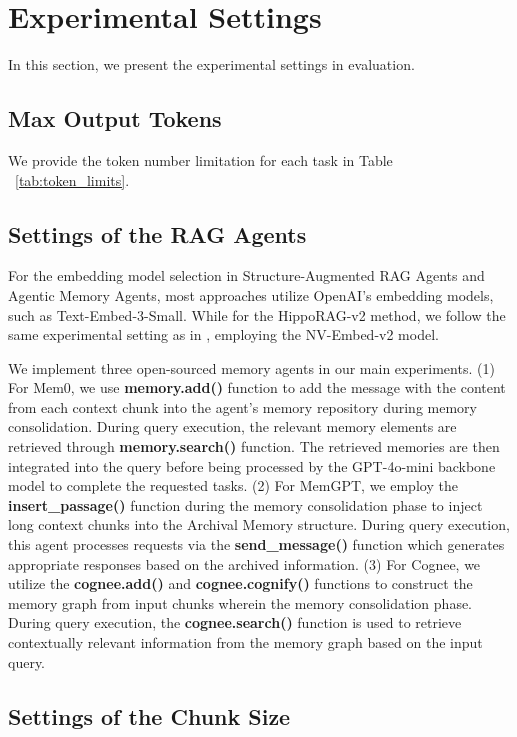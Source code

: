 \section{Experimental Settings}
\label{sec:exp_settings}

In this section, we present the experimental settings in evaluation.

\subsection{Max Output Tokens}

We provide the token number limitation for each task in Table ~\ref{tab:token_limits}. 


\subsection{Settings of the RAG Agents}

For the embedding model selection in Structure-Augmented RAG Agents and Agentic Memory Agents, most approaches utilize OpenAI's embedding models, such as Text-Embed-3-Small. While for the HippoRAG-v2 method, we follow the same experimental setting as in \citet{hipporag-v2}, employing the NV-Embed-v2 model.  

We implement three open-sourced memory agents in our main experiments. (1) For Mem0, we use \textbf{memory.add()} function to add the message with the content from each context chunk into the agent's memory repository during memory consolidation. During query execution, the relevant memory elements are retrieved through \textbf{memory.search()} function. The retrieved memories are then integrated into the query before being processed by the GPT-4o-mini backbone model to complete the requested tasks. (2) For MemGPT, we employ the \textbf{insert\_passage()} function during the memory consolidation phase to inject long context chunks into the Archival Memory structure. During query execution, this agent processes requests via the \textbf{send\_message()} function which generates appropriate responses based on the archived information. (3) For Cognee, we utilize the \textbf{cognee.add()} and \textbf{cognee.cognify()} functions to construct the memory graph from input chunks wherein the memory consolidation phase. During query execution, the \textbf{cognee.search()} function is used to retrieve contextually relevant information from the memory graph based on the input query. 


\subsection{Settings of the Chunk Size}

